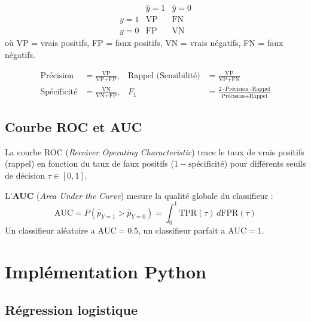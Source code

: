 \begin{definition}
\[
  \begin{array}{c|cc}
    & \hat{y} = 1 & \hat{y} = 0 \\ \hline
    y = 1 & \text{VP} & \text{FN} \\
    y = 0 & \text{FP} & \text{VN}
  \end{array}
\]
o\`u VP = vrais positifs, FP = faux positifs, VN = vrais n\'egatifs, FN = faux n\'egatifs.
\end{definition}

\begin{formules}[title=\textbf{M\'etriques de classification}]
\begin{align*}
  \text{Pr\'ecision} &= \frac{\text{VP}}{\text{VP} + \text{FP}}, &
  \text{Rappel (Sensibilit\'e)} &= \frac{\text{VP}}{\text{VP} + \text{FN}} \\[4pt]
  \text{Sp\'ecificit\'e} &= \frac{\text{VN}}{\text{VN} + \text{FP}}, &
  F_1 &= \frac{2 \cdot \text{Pr\'ecision} \cdot \text{Rappel}}{\text{Pr\'ecision} + \text{Rappel}}
\end{align*}
\end{formules}

\subsection{Courbe ROC et AUC}

\begin{definition}
La courbe ROC (\emph{Receiver Operating Characteristic}) trace le taux de vrais positifs
(rappel) en fonction du taux de faux positifs ($1 - \text{sp\'ecificit\'e}$) pour
diff\'erents seuils de d\'ecision $\tau \in [0, 1]$.

L'\textbf{AUC} (\emph{Area Under the Curve}) mesure la qualit\'e globale du classifieur :
\[
  \text{AUC} = P(\hat{p}_{Y=1} > \hat{p}_{Y=0}) = \int_0^1 \text{TPR}(\tau)\, d\text{FPR}(\tau)
\]
Un classifieur al\'eatoire a $\text{AUC} = 0.5$, un classifieur parfait a $\text{AUC} = 1$.
\end{definition}

\section{Impl\'ementation Python}
\label{sec:classif-python}

\subsection{R\'egression logistique}

